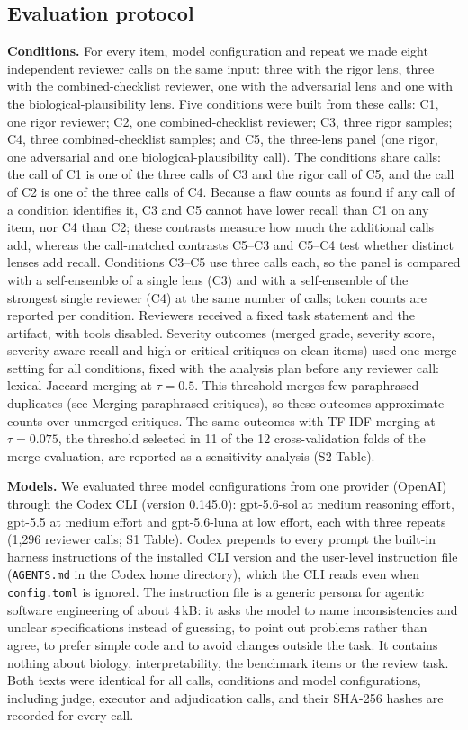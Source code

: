 \documentclass[10pt,letterpaper]{article}
\begin{document}
\subsection*{Evaluation protocol}

\textbf{Conditions.} For every item, model configuration and repeat we made eight independent reviewer calls on the same input: three with the rigor lens, three with the combined-checklist reviewer, one with the adversarial lens and one with the biological-plausibility lens. Five conditions were built from these calls: C1, one rigor reviewer; C2, one combined-checklist reviewer; C3, three rigor samples; C4, three combined-checklist samples; and C5, the three-lens panel (one rigor, one adversarial and one biological-plausibility call). The conditions share calls: the call of C1 is one of the three calls of C3 and the rigor call of C5, and the call of C2 is one of the three calls of C4. Because a flaw counts as found if any call of a condition identifies it, C3 and C5 cannot have lower recall than C1 on any item, nor C4 than C2; these contrasts measure how much the additional calls add, whereas the call-matched contrasts C5--C3 and C5--C4 test whether distinct lenses add recall. Conditions C3--C5 use three calls each, so the panel is compared with a self-ensemble of a single lens (C3) and with a self-ensemble of the strongest single reviewer (C4) at the same number of calls; token counts are reported per condition. Reviewers received a fixed task statement and the artifact, with tools disabled. Severity outcomes (merged grade, severity score, severity-aware recall and high or critical critiques on clean items) used one merge setting for all conditions, fixed with the analysis plan before any reviewer call: lexical Jaccard merging at $\tau=0.5$. This threshold merges few paraphrased duplicates (see Merging paraphrased critiques), so these outcomes approximate counts over unmerged critiques. The same outcomes with TF-IDF merging at $\tau=0.075$, the threshold selected in 11 of the 12 cross-validation folds of the merge evaluation, are reported as a sensitivity analysis (S2 Table).

\textbf{Models.} We evaluated three model configurations from one provider (OpenAI) through the Codex CLI (version 0.145.0): gpt-5.6-sol at medium reasoning effort, gpt-5.5 at medium effort and gpt-5.6-luna at low effort, each with three repeats (1,296 reviewer calls; S1 Table). Codex prepends to every prompt the built-in harness instructions of the installed CLI version and the user-level instruction file (\texttt{AGENTS.md} in the Codex home directory), which the CLI reads even when \texttt{config.toml} is ignored. The instruction file is a generic persona for agentic software engineering of about 4\,kB: it asks the model to name inconsistencies and unclear specifications instead of guessing, to point out problems rather than agree, to prefer simple code and to avoid changes outside the task. It contains nothing about biology, interpretability, the benchmark items or the review task. Both texts were identical for all calls, conditions and model configurations, including judge, executor and adjudication calls, and their SHA-256 hashes are recorded for every call.
\end{document}
